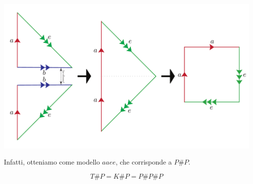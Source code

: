 \begin{observe}
\begin{center}
	\includegraphics[trim=0cm 0cm 0cm 0cm, clip, scale=0.3]{images/kleintoprojdouble2.pdf}
\end{center}
Infatti, otteniamo come modello $aaee$, che corrisponde a $P\# P$.
\end{observe}
\begin{lemming}
	\begin{equation}
		T\# P= K\# P=P\# P\# P
	\end{equation}
\vspace{-6mm}
\end{lemming}
